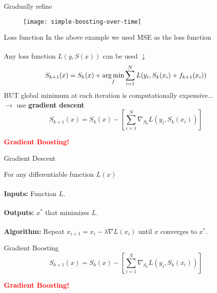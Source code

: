 \begin{frame}{Gradually refine}

  \begin{figure}
    \texttt{[image: simple-boosting-over-time]}
  \end{figure}
  
\end{frame}
%

\begin{frame}{Loss function}
In the above example we used MSE as the loss function\\~\\
Any loss function $L\left(y, S(x)\right)$ can be used $\downarrow$
$$S_{k + 1}(x) = S_k(x) + \operatorname*{arg\,min}_{f} \sum^N_{i=1}L(y_i, S_k(x_i) + f_{k+1}(x_i))$$
BUT global minimum at each iteration is computationally expensive...\\
$\to$ use \textbf{gradient descent}
$$S_{k + 1}(x) = S_k(x) - \left[\sum^N_{i=1}\nabla_{S_k}L(y_i, S_k(x_i))\right]$$
\begin{center}
  \textbf{\textcolor{red}{Gradient Boosting!}}
\end{center}

\end{frame}
%


\begin{frame}{Gradient Descent}

For any differentiable function $L(x)$ \\~\\

\textbf{Inputs:} Function $L$. \\~\\

\textbf{Outputs:} $x^*$ that minimizes $L$. \\~\\

\textbf{Algorithm:} Repeat $x_{i+1} = x_i - \lambda \nabla L(x_i)$ until $x$ converges to $x^*$.

\end{frame}
%

\begin{frame}{Gradient Boosting}
$$S_{k + 1}(x) = S_k(x) - \left[\sum^N_{i=1}\nabla_{S_k}L(y_i, S_k(x_i))\right]$$
\begin{center}
  \textbf{\textcolor{red}{Gradient Boosting!}}
\end{center}

\end{frame}
%


